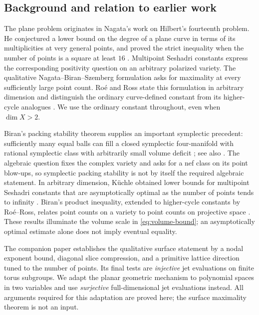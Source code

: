 \subsection{Background and relation to earlier work}

The plane problem originates in Nagata's work on Hilbert's fourteenth
problem. He conjectured a lower bound on the degree of a plane curve in
terms of its multiplicities at very general points, and proved the strict
inequality when the number of points is a square at least $16$
\cite{Nagata1959}. Multipoint Seshadri constants express the corresponding
positivity question on an arbitrary polarized variety. The qualitative
Nagata--Biran--Szemberg formulation asks for maximality at every sufficiently
large point count. Ro\'e and Ross state this formulation in arbitrary
dimension and distinguish the ordinary curve-defined constant from its
higher-cycle analogues \cite[Conjecture~1.3 and Remark~1.4]{RoeRoss2009}.
We use the ordinary constant throughout, even when $\dim X>2$.

Biran's packing stability theorem supplies an important symplectic
precedent: sufficiently many equal balls can fill a closed symplectic
four-manifold with rational symplectic class with arbitrarily small volume
deficit \cite{Biran1999}; see also \cite[Theorem~6.3]{Biran2001}. The algebraic
question fixes the complex variety and asks for a nef class on its point
blow-ups, so symplectic packing stability is not by itself the required
algebraic statement. In arbitrary dimension, K\"uchle obtained lower bounds
for multipoint Seshadri constants that are asymptotically optimal as the
number of points tends to infinity \cite[Theorem~1.1]{Kuechle1996}.
Biran's product inequality, extended to higher-cycle constants by
Ro\'e--Ross, relates point counts on a variety to point counts on projective
space \cite[Theorem~1.1 and Remark~1.2]{RoeRoss2009}.
These results illuminate the volume scale in \eqref{eq:volume-bound}; an
asymptotically optimal estimate alone does not imply eventual equality.

The companion paper \cite{OpenAI2026Surfaces} establishes the qualitative
surface statement by a nodal exponent bound, diagonal slice compression,
and a primitive lattice direction tuned to the number of points. Its final
tests are \emph{injective} jet evaluations on finite torus subgroups.
We adapt the planar geometric mechanism to polynomial spaces in two
variables and use \emph{surjective} full-dimensional jet evaluations instead.
All arguments required for this adaptation are proved here; the surface
maximality theorem is not an input.

